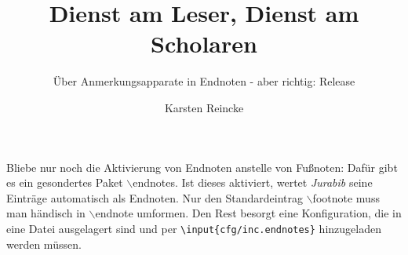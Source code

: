 \documentclass[
  DIV=calc,
  BCOR=5mm,
  11pt,
  headings=small,
  oneside,
  abstract=true,
  toc=bib,
  english,ngerman]{scrartcl}
\begin{document}
\nocite{*}

\titlehead{scholar-enno.de: my Classical Scholar Research framework}
\subject{(Geistes-) Wissenschaftliche Texte mit \textit{jurabib}}
\title{Dienst am Leser, Dienst am Scholaren}
\subtitle{Über Anmerkungsapparate in Endnoten - aber richtig: Release }
\author{Karsten Reincke}

\maketitle



\footnotesize
\tableofcontents
\normalsize







Bliebe nur noch die Aktivierung von Endnoten anstelle von Fußnoten: Dafür gibt es
ein gesondertes Paket $\backslash$endnotes. Ist dieses aktiviert, wertet
\emph{Jurabib} seine Einträge automatisch als Endnoten. Nur den Standardeintrag
$\backslash$footnote muss man händisch in $\backslash$endnote umformen. Den Rest
besorgt eine Konfiguration, die in eine Datei ausgelagert sind und per
\texttt{{\textbackslash}input\{cfg/inc.endnotes\}} hinzugeladen werden müssen. 







\small




\printnomenclature

\theendnotes

\end{document}
